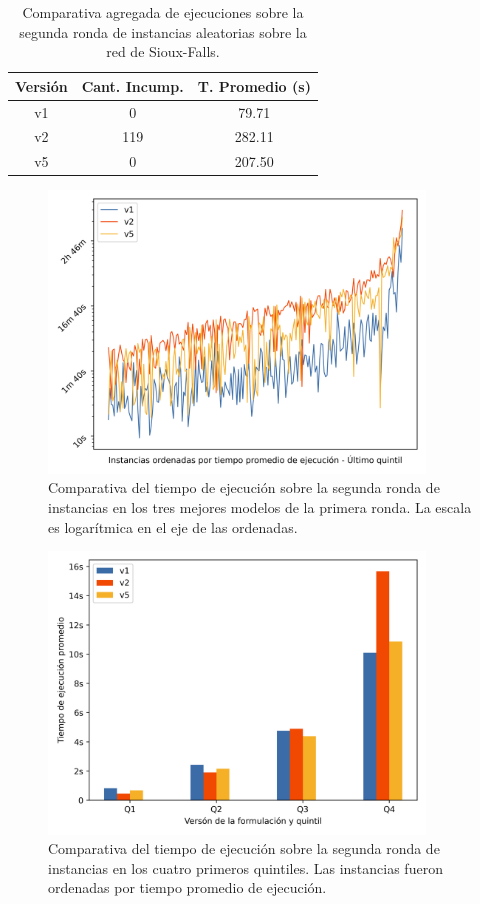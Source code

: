 
\begin{table}[h!]
  \centering
  \begin{tabular}{ccc}
    \toprule
    Versión & Cant. Incump. & T. Promedio (s) \\
    \midrule
    v1 & 0   & 79.71   \\
    v2 & 119 & 282.11  \\
    v5 & 0   & 207.50  \\
    \bottomrule
  \end{tabular}
  \caption{Comparativa agregada de ejecuciones sobre la segunda ronda de instancias aleatorias sobre la red de Sioux-Falls.}\label{table:resumenreejecuciones}
\end{table}

\begin{figure}[h!]
  \centering
  \includegraphics[width=10cm]{../resources/run_time_comparsion_rerun.png}
  \caption{Comparativa del tiempo de ejecución sobre la segunda ronda de instancias en los tres mejores modelos de la primera ronda. La escala es logarítmica en el eje de las ordenadas.} \label{fig:runtimecomparisonrerun}
\end{figure}

\begin{figure}[h!]
  \centering
  \includegraphics[width=10cm]{../resources/run_time_comparsion_by_quintile_rerun.png}
  \caption{Comparativa del tiempo de ejecución sobre la segunda ronda de instancias en los cuatro primeros quintiles. Las instancias fueron ordenadas por tiempo promedio de ejecución.} \label{fig:firstfourquintilesrerun}
\end{figure}

